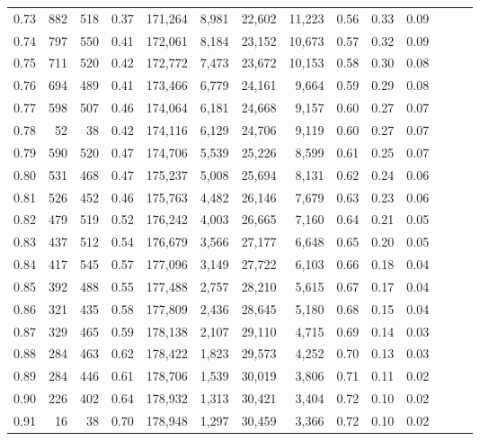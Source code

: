 \begin{tabular}{rrrrrrrrrrrrrr}
0.73 &    882 &  518 &  0.37 &  171,264 &    8,981 &  22,602 &  11,223 &  0.56 &  0.33 &      0.09 \\
0.74 &    797 &  550 &  0.41 &  172,061 &    8,184 &  23,152 &  10,673 &  0.57 &  0.32 &      0.09 \\
0.75 &    711 &  520 &  0.42 &  172,772 &    7,473 &  23,672 &  10,153 &  0.58 &  0.30 &      0.08 \\
0.76 &    694 &  489 &  0.41 &  173,466 &    6,779 &  24,161 &   9,664 &  0.59 &  0.29 &      0.08 \\
0.77 &    598 &  507 &  0.46 &  174,064 &    6,181 &  24,668 &   9,157 &  0.60 &  0.27 &      0.07 \\
0.78 &     52 &   38 &  0.42 &  174,116 &    6,129 &  24,706 &   9,119 &  0.60 &  0.27 &      0.07 \\
0.79 &    590 &  520 &  0.47 &  174,706 &    5,539 &  25,226 &   8,599 &  0.61 &  0.25 &      0.07 \\
0.80 &    531 &  468 &  0.47 &  175,237 &    5,008 &  25,694 &   8,131 &  0.62 &  0.24 &      0.06 \\
0.81 &    526 &  452 &  0.46 &  175,763 &    4,482 &  26,146 &   7,679 &  0.63 &  0.23 &      0.06 \\
0.82 &    479 &  519 &  0.52 &  176,242 &    4,003 &  26,665 &   7,160 &  0.64 &  0.21 &      0.05 \\
0.83 &    437 &  512 &  0.54 &  176,679 &    3,566 &  27,177 &   6,648 &  0.65 &  0.20 &      0.05 \\
0.84 &    417 &  545 &  0.57 &  177,096 &    3,149 &  27,722 &   6,103 &  0.66 &  0.18 &      0.04 \\
0.85 &    392 &  488 &  0.55 &  177,488 &    2,757 &  28,210 &   5,615 &  0.67 &  0.17 &      0.04 \\
0.86 &    321 &  435 &  0.58 &  177,809 &    2,436 &  28,645 &   5,180 &  0.68 &  0.15 &      0.04 \\
0.87 &    329 &  465 &  0.59 &  178,138 &    2,107 &  29,110 &   4,715 &  0.69 &  0.14 &      0.03 \\
0.88 &    284 &  463 &  0.62 &  178,422 &    1,823 &  29,573 &   4,252 &  0.70 &  0.13 &      0.03 \\
0.89 &    284 &  446 &  0.61 &  178,706 &    1,539 &  30,019 &   3,806 &  0.71 &  0.11 &      0.02 \\
0.90 &    226 &  402 &  0.64 &  178,932 &    1,313 &  30,421 &   3,404 &  0.72 &  0.10 &      0.02 \\
0.91 &     16 &   38 &  0.70 &  178,948 &    1,297 &  30,459 &   3,366 &  0.72 &  0.10 &      0.02 \\

\end{tabular}
